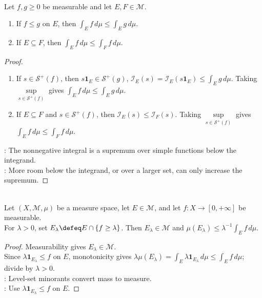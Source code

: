 \begin{proposition} \label{prop:positive-integral-monotonicity} \\
Let $f,g\geq0$ be measurable and let $E,F\in\mathcal{M}$.
\begin{enumerate}[label=(\roman*)]
\setlength{\itemsep}{0pt}
\item If $f\leq g$ on $E$, then $\int_E f\,d\mu\leq\int_E g\,d\mu$.
\item If $E\subseteq F$, then $\int_E f\,d\mu\leq\int_F f\,d\mu$.
\end{enumerate}
\begin{proof}
\begin{enumerate}[label=(\roman*)]
\setlength{\itemsep}{0pt}
\item If $s\in\mathcal{S}^+(f)$, then $s\mathbf{1}_E\in\mathcal{S}^+(g)$, $\mathcal{I}_E(s)=\mathcal{I}_E(s\mathbf{1}_E)\leq\int_Eg\,d\mu$. Taking $\sup\limits_{s\in\mathcal{S}^+(f)}$ gives $\int_Ef\,d\mu\leq\int_Eg\,d\mu$.
\item If $E\subseteq F$ and $s\in\mathcal{S}^+(f)$, then $\mathcal{I}_E(s)\leq\mathcal{I}_F(s)$. Taking $\sup\limits_{s\in\mathcal{S}^+(f)}$ gives $\int_Ef\,d\mu\leq\int_Ff\,d\mu$.
\end{enumerate}
: The nonnegative integral is a supremum over simple functions below the integrand.\\
: More room below the integrand, or over a larger set, can only increase the supremum.
\end{proof}
\end{proposition}

\begin{proposition} \label{prop:chebyshev-inequality-nonnegative-integral} \\
Let $(X,\mathcal{M},\mu)$ be a measure space, let $E\in\mathcal{M}$, and let $f:X\to[0,+\infty]$ be measurable.\\
For $\lambda>0$, set $E_\lambda\defeq E\cap\{f\geq\lambda\}$. Then $E_\lambda\in\mathcal{M}$ and $\mu(E_\lambda)\leq\lambda^{-1}\int_Ef\,d\mu$.
\begin{proof} Measurability gives $E_\lambda\in\mathcal{M}$.\\
Since $\lambda\mathbf{1}_{E_\lambda}\leq f$ on $E$, monotonicity gives $\lambda\mu(E_\lambda)=\int_E\lambda\mathbf{1}_{E_\lambda}\,d\mu\leq\int_Ef\,d\mu$; divide by $\lambda>0$.\\
: Level-set minorants convert mass to measure.\\
: Use $\lambda\mathbf{1}_{E_\lambda}\leq f$ on $E$.
\end{proof}
\end{proposition}

